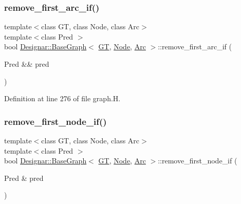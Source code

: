 \subsubsection{\texorpdfstring{remove\+\_\+first\+\_\+arc\+\_\+if()}{remove\_first\_arc\_if()}\hspace{0.1cm}{\footnotesize\ttfamily [2/2]}}
{\footnotesize\ttfamily template$<$class GT, class Node, class Arc$>$ \\
template$<$class Pred $>$ \\
bool \hyperlink{class_designar_1_1_base_graph}{Designar\+::\+Base\+Graph}$<$ \hyperlink{demo-buildgraph_8_c_a3001c40d2c31ca87ed96cd7d1334a55e}{GT}, \hyperlink{namespace_designar_a5af326c65aa2bd26b26c410f2030d09e}{Node}, \hyperlink{namespace_designar_a3f55fb5513d62ff47cbc8f72b8e95d6f}{Arc} $>$\+::remove\+\_\+first\+\_\+arc\+\_\+if (\begin{DoxyParamCaption}\item[{Pred \&\&}]{pred }\end{DoxyParamCaption})\hspace{0.3cm}{\ttfamily [inline]}}



Definition at line 276 of file graph.\+H.

\mbox{\label{class_designar_1_1_base_graph_a1311af417ba4d373d7051b73cc2696ec}} 
\subsubsection{\texorpdfstring{remove\+\_\+first\+\_\+node\+\_\+if()}{remove\_first\_node\_if()}\hspace{0.1cm}{\footnotesize\ttfamily [1/2]}}
{\footnotesize\ttfamily template$<$class GT, class Node, class Arc$>$ \\
template$<$class Pred $>$ \\
bool \hyperlink{class_designar_1_1_base_graph}{Designar\+::\+Base\+Graph}$<$ \hyperlink{demo-buildgraph_8_c_a3001c40d2c31ca87ed96cd7d1334a55e}{GT}, \hyperlink{namespace_designar_a5af326c65aa2bd26b26c410f2030d09e}{Node}, \hyperlink{namespace_designar_a3f55fb5513d62ff47cbc8f72b8e95d6f}{Arc} $>$\+::remove\+\_\+first\+\_\+node\+\_\+if (\begin{DoxyParamCaption}\item[{Pred \&}]{pred }\end{DoxyParamCaption})\hspace{0.3cm}{\ttfamily [inline]}}



